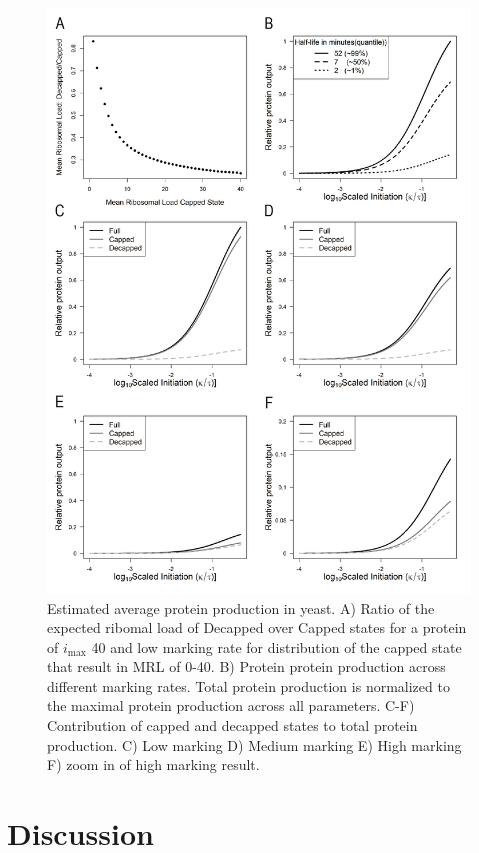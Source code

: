 \documentclass[review]{elsarticle}
\newcommand{\imax}{\ensuremath{{i_{\max}}}\xspace}
\begin{document}
\begin{figure}[!ht]
\centering
\includegraphics[width = 135mm]{Images/2023-07-17_Protein_Production.png}
\caption{Estimated average protein production in yeast. A) Ratio of the expected ribomal load of Decapped over Capped states for a protein of \imax 40 and low marking rate for distribution of the capped state that result in MRL of 0-40. B) Protein protein production across different marking rates. Total protein production is normalized to the maximal protein production across all parameters. C-F) Contribution of capped and decapped states to total protein production. C) Low marking D) Medium marking E) High marking F) zoom in of high marking result. }
\end{figure}
\clearpage

\section{Discussion}
\end{document}
